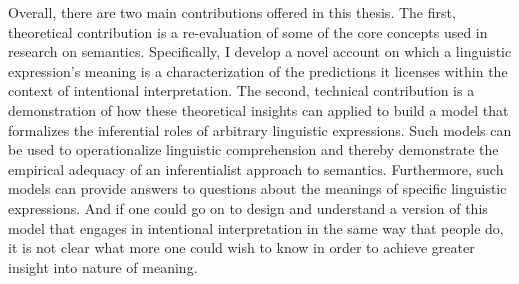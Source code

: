 Overall, there are two main contributions offered in this thesis. The first, theoretical contribution is a re-evaluation of some of the core concepts used in research on semantics. Specifically, I develop a novel account on which a linguistic expression's meaning is a characterization of the predictions it licenses within the context of intentional interpretation. The second, technical contribution is a demonstration of how these theoretical insights can applied to build a model that formalizes the inferential roles of arbitrary linguistic expressions. Such models can be used to operationalize linguistic comprehension and thereby demonstrate the empirical adequacy of an inferentialist approach to semantics. Furthermore, such models can provide answers to questions about the meanings of specific linguistic expressions. And if one could go on to design and understand a version of this model that engages in intentional interpretation in the same way that people do, it is not clear what more one could wish to know in order to achieve greater insight into nature of meaning.